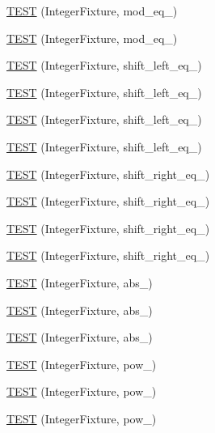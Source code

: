 \begin{DoxyCompactItemize}
\item 
\hyperlink{TestInteger_8c_09_09_a36f119c3db3758568817ec108eb63065}{T\-E\-S\-T} (Integer\-Fixture, mod\-\_\-eq\-\_)
\item 
\hyperlink{TestInteger_8c_09_09_a26547e29d40993af6eb8ea4ff5706979}{T\-E\-S\-T} (Integer\-Fixture, mod\-\_\-eq\-\_)
\item 
\hyperlink{TestInteger_8c_09_09_ac740b7b7c722a8335d3faa5beff027ed}{T\-E\-S\-T} (Integer\-Fixture, shift\-\_\-left\-\_\-eq\-\_)
\item 
\hyperlink{TestInteger_8c_09_09_a5b92261d9dfec163099bcb992d010f1c}{T\-E\-S\-T} (Integer\-Fixture, shift\-\_\-left\-\_\-eq\-\_)
\item 
\hyperlink{TestInteger_8c_09_09_ae9ed3e47eb2ded00700aabcf2ccf9d6a}{T\-E\-S\-T} (Integer\-Fixture, shift\-\_\-left\-\_\-eq\-\_)
\item 
\hyperlink{TestInteger_8c_09_09_a3196445ee2db0cea5c55857ec9095d7e}{T\-E\-S\-T} (Integer\-Fixture, shift\-\_\-left\-\_\-eq\-\_)
\item 
\hyperlink{TestInteger_8c_09_09_ab91e3f9b510a037011043aa9f86a918d}{T\-E\-S\-T} (Integer\-Fixture, shift\-\_\-right\-\_\-eq\-\_)
\item 
\hyperlink{TestInteger_8c_09_09_a49aa379b2f6783dd847af3791ffd7a7c}{T\-E\-S\-T} (Integer\-Fixture, shift\-\_\-right\-\_\-eq\-\_)
\item 
\hyperlink{TestInteger_8c_09_09_aa880de9340ed39214db5ddca6742ae3c}{T\-E\-S\-T} (Integer\-Fixture, shift\-\_\-right\-\_\-eq\-\_)
\item 
\hyperlink{TestInteger_8c_09_09_a9de0a04069cdba0d3b0f7390791eae81}{T\-E\-S\-T} (Integer\-Fixture, shift\-\_\-right\-\_\-eq\-\_)
\item 
\hyperlink{TestInteger_8c_09_09_a67c6be927a65f050a850d57b8c62ba4e}{T\-E\-S\-T} (Integer\-Fixture, abs\-\_)
\item 
\hyperlink{TestInteger_8c_09_09_a4a84e53aaa6ac60ae0c975f07a3d6d6d}{T\-E\-S\-T} (Integer\-Fixture, abs\-\_)
\item 
\hyperlink{TestInteger_8c_09_09_a9ff96d62c1540bd68cfa98cf5e6f1c44}{T\-E\-S\-T} (Integer\-Fixture, abs\-\_)
\item 
\hyperlink{TestInteger_8c_09_09_ac202bf13a21c16463a79d16f3151009b}{T\-E\-S\-T} (Integer\-Fixture, pow\-\_)
\item 
\hyperlink{TestInteger_8c_09_09_afd294dcefff9809ee26b3f1fb1624a54}{T\-E\-S\-T} (Integer\-Fixture, pow\-\_)
\item 
\hyperlink{TestInteger_8c_09_09_a0950d70a3cb56b8119f1f06bbe47adc8}{T\-E\-S\-T} (Integer\-Fixture, pow\-\_)

\end{DoxyCompactItemize}

